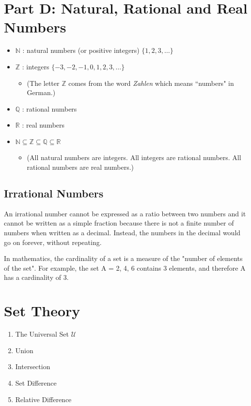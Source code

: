 \documentclass[]{report}
\begin{document}
\section*{Part D: Natural, Rational and Real Numbers}
\begin{itemize}
\item $\mathbb{N}$ : natural numbers (or positive integers) $\{1,2,3,\ldots\}$
\item $\mathbb{Z}$ : integers $\{-3,-2,-1,0,1,2,3,\ldots\}$
\begin{itemize}
\item (The letter $\mathbb{Z}$ comes from the word \emph{Zahlen} which means ``numbers" in German.)
\end{itemize}
\item $\mathbb{Q}$ : rational numbers
\item $\mathbb{R}$ : real numbers
\item $\mathbb{N} \subseteq \mathbb{Z } \subseteq \mathbb{Q} \subseteq \mathbb{R}$
\begin{itemize}
\item (All natural numbers are integers. All integers are rational numbers. All rational numbers are real numbers.)
\end{itemize}
\end{itemize}




\subsection{Irrational Numbers}
An irrational number cannot be expressed as a ratio between two numbers and it cannot be written as a simple fraction because there is not a finite number of numbers when written as a decimal. Instead, the numbers in the decimal would go on forever, without repeating.



In mathematics, the cardinality of a set is a measure of the "number of elements of the set". For example, the set A = {2, 4, 6} contains 3 elements, and therefore A has a cardinality of 3.







\section{Set Theory}
\begin{enumerate}
\item The Universal Set $\mathcal{U}$
\item Union
\item Intersection
\item Set Difference
\item Relative Difference
\end{enumerate}
\end{document}
